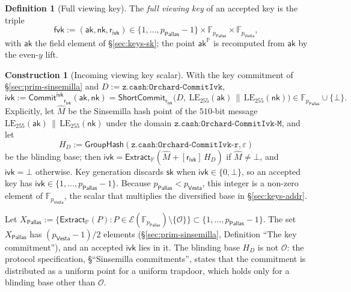 \documentclass[11pt,a4paper]{article}
\theoremstyle{definition}
\newtheorem{definition}[theorem]{Definition}
\newtheorem{construction}[theorem]{Construction}
\newcommand{\F}{\mathbb{F}}
\newcommand{\PP}{\mathbb{P}}
\newcommand{\Pallas}{\ensuremath{\mathsf{Pallas}}}
\newcommand{\Vesta}{\ensuremath{\mathsf{Vesta}}}
\newcommand{\Ep}{\ensuremath{\mathcal{E}}}
\newcommand{\ShortCommit}{\ensuremath{\mathsf{ShortCommit}}}
\newcommand{\CommitIvk}{\ensuremath{\mathsf{Commit}^{\mathsf{ivk}}}}
\newcommand{\Extract}{\ensuremath{\mathsf{Extract}}}
\newcommand{\GroupHash}{\ensuremath{\mathsf{GroupHash}}}
\newcommand{\aksym}{\ensuremath{\mathsf{ak}}}
\newcommand{\nksym}{\ensuremath{\mathsf{nk}}}
\newcommand{\ivk}{\ensuremath{\mathsf{ivk}}}
\newcommand{\fvk}{\ensuremath{\mathsf{fvk}}}
\newcommand{\rivk}{\ensuremath{\mathsf{r_{ivk}}}}
\begin{document}
\begin{definition}[Full viewing key]
The \emph{full viewing key} of an accepted key is the triple
\[
  \fvk := (\aksym, \nksym, \rivk) \in \{1, \dots, p_{\Pallas} - 1\}
    \times \F_{p_{\Pallas}} \times \F_{p_{\Vesta}},
\]
with $\aksym$ the field element of \S\ref{sec:keys-sk}; the point
$\aksym^{\PP}$ is recomputed from $\aksym$ by the even-$y$ lift.
\end{definition}

\begin{construction}[Incoming viewing key scalar]
With the key commitment of \S\ref{sec:prim-sinsemilla} and
$D := \texttt{z.cash:Orchard-CommitIvk}$,
\[
  \ivk := \CommitIvk_{\rivk}(\aksym, \nksym)
    = \ShortCommit_{\rivk}\bigl(D,\
      \mathrm{LE}_{255}(\aksym) \,\|\, \mathrm{LE}_{255}(\nksym)\bigr)
    \in \F_{p_{\Pallas}} \cup \{\bot\}.
\]
Explicitly, let $\hat{M}$ be the Sinsemilla hash point of the $510$-bit
message $\mathrm{LE}_{255}(\aksym) \,\|\, \mathrm{LE}_{255}(\nksym)$ under
the domain $\texttt{z.cash:Orchard-CommitIvk-M}$, and let
\[
  H_D := \GroupHash(\texttt{z.cash:Orchard-CommitIvk-r}, \varepsilon)
\]
be the blinding base; then $\ivk = \Extract_{\PP}(\hat{M} + [\rivk]\,H_D)$
if $\hat{M} \neq \bot$, and $\ivk = \bot$ otherwise. Key generation discards
$\mathsf{sk}$ when $\ivk \in \{0, \bot\}$, so an accepted key has
$\ivk \in \{1, \dots, p_{\Pallas} - 1\}$. Because $p_{\Pallas} <
p_{\Vesta}$, this integer is a non-zero element of $\F_{p_{\Vesta}}$, the
scalar that multiplies the diversified base in \S\ref{sec:keys-addr}.
\end{construction}

Let $X_{\Pallas} := \{\Extract_{\PP}(P) : P \in \Ep(\F_{p_{\Pallas}})
\setminus \{\mathcal{O}\}\} \subset \{1, \dots, p_{\Pallas} - 1\}$. The set
$X_{\Pallas}$ has $(p_{\Vesta} - 1)/2$ elements (\S\ref{sec:prim-sinsemilla},
Definition ``The key commitment''), and an accepted $\ivk$ lies in it. The
blinding base $H_D$ is not $\mathcal{O}$: the protocol specification,
\S``Sinsemilla commitments'', states that the commitment is distributed as a
uniform point for a uniform trapdoor, which holds only for a blinding base
other than $\mathcal{O}$.
\end{document}
